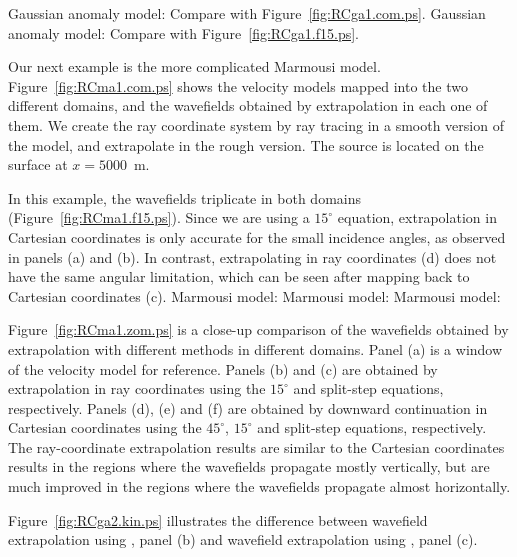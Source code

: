 {Gaussian anomaly model: 
Compare with Figure~\ref{fig:RCga1.com.ps}.}
{Gaussian anomaly model: 
Compare with Figure~\ref{fig:RCga1.f15.ps}.}
\par
Our next example is the more complicated Marmousi
model. Figure~\ref{fig:RCma1.com.ps} shows
the velocity models mapped into the two
different domains, and the wavefields obtained
by extrapolation in each one of them.
We create the ray coordinate system by 
ray tracing in a smooth version of the model,
and extrapolate in the rough version.
The source is located on the surface at $x=5000$~m.
\par
In this example, the wavefields triplicate in 
both domains (Figure~\ref{fig:RCma1.f15.ps}).
Since we are using a $15^\circ$ equation,
extrapolation in Cartesian coordinates is only
accurate for the small incidence angles, as
observed in panels (a) and (b).
In contrast, extrapolating in ray coordinates
(d) does not have the same angular limitation,
which can be seen after mapping back to 
Cartesian coordinates (c).
{Marmousi model: }
{Marmousi model: }
{Marmousi model: \captionMarmousiZoom}
\par
Figure~\ref{fig:RCma1.zom.ps} is a close-up
comparison of the wavefields obtained by 
extrapolation with different methods in different
domains.
Panel (a) is a window of the velocity model for
reference. Panels (b) and (c) are obtained
by extrapolation in ray coordinates using
the $15^\circ$ and split-step equations, respectively.
Panels (d), (e) and (f) are obtained
by downward continuation in Cartesian coordinates
using the $45^\circ$, $15^\circ$ and split-step
equations, respectively.
The ray-coordinate extrapolation results are similar
to the Cartesian coordinates results in the regions
where the wavefields propagate mostly vertically,
but are much improved in the regions where the 
wavefields propagate almost horizontally.
\par
Figure~\ref{fig:RCga2.kin.ps} illustrates the difference
between wavefield extrapolation using , panel (b)
and wavefield extrapolation using , panel (c).
